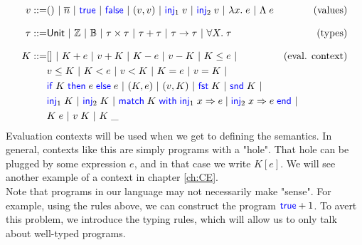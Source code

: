 \documentclass[a4paper, 11pt]{report}
\theoremstyle{definition}
\newcommand{\BNFdef}{::=}
\newcommand{\ALT}{~|~}
\newcommand{\Keyword}[1]{{\color{blue} \mathsf{#1}}}
\newcommand{\var}{x}
\newcommand{\expr}{e}
\newcommand{\val}{v}
\newcommand{\TT}{()}
\newcommand{\Num}[1]{\overline{#1}}
\newcommand{\True}{\Keyword{true}}
\newcommand{\False}{\Keyword{false}}
\newcommand{\IfCmd}{\Keyword{if}}
\newcommand{\ThenCmd}{\Keyword{then}}
\newcommand{\ElseCmd}{\Keyword{else}}
\def\If#1then#2else#3{\IfCmd{}\;#1\;\ThenCmd{}\;#2\;\ElseCmd{}\;#3}
\newcommand{\Fst}{\Keyword{fst}\;}
\newcommand{\Snd}{\Keyword{snd}\;}
\newcommand{\Inj}[1]{\Keyword{inj}_{#1}\;}
\newcommand{\MatchCmd}{\Keyword{match}}
\newcommand{\WithCmd}{\Keyword{with}}
\newcommand{\EndCmd}{\Keyword{end}}
\def\Match#1with#2=>#3|#4=>#5end{\MatchCmd{}\;#1\;\WithCmd{}\;#2\Rightarrow#3 \;|\;#4\Rightarrow#5\;\EndCmd{}}
\newcommand{\Tvar}{X}
\newcommand{\Tlam}{\Lambda\;}
\newcommand{\Tapp}[1]{#1\;\_}
\newcommand{\empelctx}{[]}
\newcommand{\elctx}{K}
\newcommand{\Tunit}{\mathsf{Unit}}
\newcommand{\Tint}{\mathbb{Z}}
\newcommand{\Tbool}{\mathbb{B}}
\newcommand{\Tprod}[2]{#1 \times #2}
\newcommand{\Tsum}[2]{#1 + #2}
\newcommand{\Tfunc}[2]{#1 \rightarrow #2}
\newcommand{\Tall}[2]{\forall #1.\; #2}
\newcommand{\typ}{\tau}
\begin{document}
\begin{align*}
  \val \BNFdef  & \TT \ALT \Num{n} \ALT \True \ALT \False \ALT
                  (\val, \val) \ALT \Inj{1} \val \ALT \Inj{2} \val \ALT
                  \fun \var . \expr \ALT \Tlam \expr
                  & \text{(values)}\\[8pt]
  \typ \BNFdef  & \Tunit \ALT \Tint \ALT \Tbool \ALT {\Tprod \typ \typ} \ALT
                  {\Tsum \typ \typ} \ALT {\Tfunc \typ \typ} \ALT 
                  {\Tall \Tvar \typ} & \text{(types)}\\[8pt]
  \elctx \BNFdef& \empelctx \ALT 
                  \elctx + \expr \ALT \val + \elctx \ALT
                  \elctx - \expr \ALT \val - \elctx \ALT
                  \elctx \le \expr \ALT
                  & \text{(eval. context)}\\
                & \val \le \elctx \ALT
                  \elctx < \expr \ALT \val < \elctx \ALT
                  \elctx = \expr \ALT \val = \elctx \ALT\\
                & {\If \elctx then \expr else \expr} \ALT
                  (\elctx, \expr) \ALT (\val, \elctx) \ALT
                  \Fst \elctx \ALT \Snd \elctx \ALT\\
                & \Inj{1} \elctx \ALT \Inj{2} \elctx \ALT
                  \Match \elctx with \Inj{1} \var => \expr | \Inj{2} \var => \expr end \ALT \span \\
                & \elctx \; \expr \ALT \val \; \elctx \ALT \Tapp{\elctx}
\end{align*}
Evaluation contexts will be used when we get to defining the semantics. In general, contexts like this are simply programs with a "hole". That hole can be plugged by some expression $\expr$, and in that case we write $\elctx[\expr]$. We will see another example of a context in chapter \ref{ch:CE}.\\
Note that programs in our language may not necessarily make "sense". For example, using the rules above, we can construct the program $\True + 1$. To avert this problem, we introduce the typing rules, which will allow us to only talk about well-typed programs.
\end{document}
